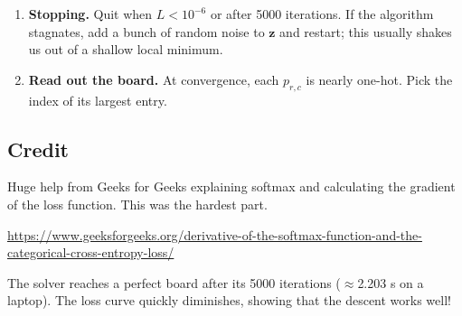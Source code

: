 \documentclass[12pt]{article}
\begin{document}
\begin{enumerate}
    \item \textbf{Stopping.} Quit when $L<10^{-6}$ or after 5000 iterations. If the
          algorithm stagnates, add a bunch of random noise to $\mathbf z$ and
          restart; this usually shakes us out of a shallow local minimum.
    
    \item \textbf{Read out the board.} At convergence, each $p_{r,c}$ is nearly
          one-hot. Pick the index of its largest entry.
\end{enumerate}

\subsection{Credit}
Huge help from Geeks for Geeks explaining softmax and calculating the gradient of the loss function. This was the hardest part. 

\url{https://www.geeksforgeeks.org/derivative-of-the-softmax-function-and-the-categorical-cross-entropy-loss/}

The solver reaches a perfect board after its 5000 iterations ($\approx$2.203 s on a
laptop). The loss curve quickly diminishes, showing that the descent works well!
\end{document}
